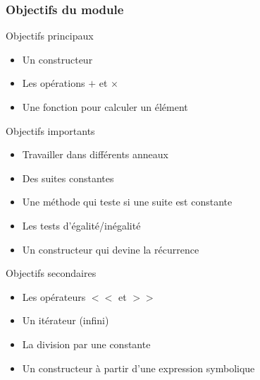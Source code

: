 \documentclass{beamer}
\begin{document}
\begin{frame}
\frametitle{Objectifs du module}
\begin{center}
\begin{block}{Objectifs principaux}
    \begin{itemize}
        \item Un constructeur
        \item Les opérations $+$ et $\times$
        \item Une fonction pour calculer un élément
    \end{itemize}
\end{block}
\pause
\begin{minipage}{0.45\textwidth} \begin{center}
    \begin{block}{Objectifs importants}
        \begin{itemize}
            \item Travailler dans différents anneaux
            \item Des suites constantes
            \item Une méthode qui teste si une suite est constante
            \item Les tests d'égalité/inégalité
            \item Un constructeur qui devine la récurrence
        \end{itemize}
    \end{block}
\end{center} \end{minipage}
\hspace{2ex} \pause
\begin{minipage}{0.45\textwidth} \begin{center}
    \begin{block}{Objectifs secondaires}
        \begin{itemize}
            \item Les opérateurs $<<$ et $>>$
            \item Un itérateur (infini)
            \item La division par une constante
            \item Un constructeur à partir d'une expression symbolique
        \end{itemize}
    \end{block}
\end{center} \end{minipage}
\end{center}
\end{frame}
\end{document}
